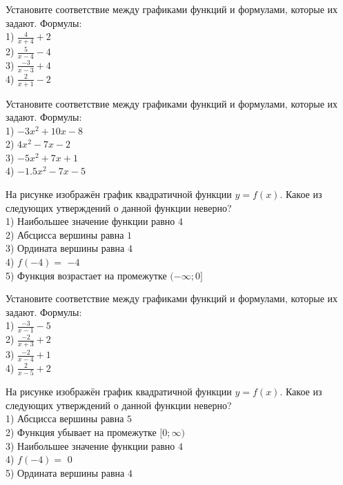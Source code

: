 \documentclass[4apaper]{article}
\begin{document}
\begin{taskBN}{1}
Установите соответствие между графиками функций и формулами, которые их задают. Формулы: \\1) $\frac{4}{x+4}+2$\\2) $\frac{5}{x-4}-4$\\3) $\frac{-3}{x-3}+4$\\4) $\frac{2}{x+1}-2$
\end{taskBN}

\begin{taskBN}{2}
Установите соответствие между графиками функций и формулами, которые их задают. Формулы: \\1) $-3x^2+10x-8$\\2) $4x^2-7x-2$\\3) $-5x^2+7x+1$\\4) $-1.5x^2-7x-5$
\end{taskBN}

\begin{taskBN}{3}
На рисунке изображён график квадратичной функции $y=f(x)$. Какое из следующих утверждений о данной функции неверно?\\1) Наибольшее значение функции равно  $4$\\2) Абсцисса вершины равна $1$\\3) Ордината вершины равна $4$\\4) $f(-4)=$ $-4$\\5) Функция возрастает на промежутке $(-\infty;0]$
\end{taskBN}

\begin{taskBN}{4}
Установите соответствие между графиками функций и формулами, которые их задают. Формулы: \\1) $\frac{-3}{x-1}-5$\\2) $\frac{-2}{x+3}+2$\\3) $\frac{-2}{x-4}+1$\\4) $\frac{2}{x-5}+2$
\end{taskBN}

\begin{taskBN}{5}
На рисунке изображён график квадратичной функции $y=f(x)$. Какое из следующих утверждений о данной функции неверно?\\1) Абсцисса вершины равна $5$\\2) Функция убывает на промежутке $[0; \infty)$\\3) Наибольшее значение функции равно  $4$\\4) $f(-4)=$ $0$\\5) Ордината вершины равна $4$
\end{taskBN}
\end{document}
